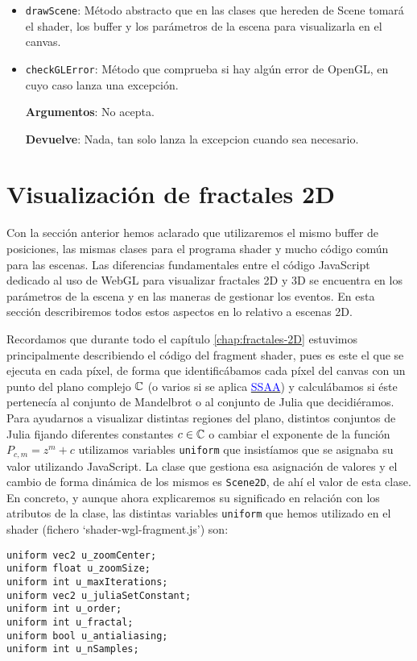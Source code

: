 \begin{itemize}
    \item \verb|drawScene|: Método abstracto que en las clases que hereden de Scene tomará el shader, los buffer y los parámetros de la escena para visualizarla en el canvas.
    
    \item  \verb|checkGLError|: Método que comprueba si hay algún error de OpenGL, en cuyo caso lanza una excepción.
    
    \textbf{Argumentos}: No acepta.
    
    \textbf{Devuelve}: Nada, tan solo lanza la excepcion cuando sea necesario.
\end{itemize}


\section{Visualización de fractales 2D}

Con la sección anterior hemos aclarado que utilizaremos el mismo buffer de posiciones, las mismas clases para el programa shader y mucho código común para las escenas. Las diferencias fundamentales entre el código JavaScript dedicado al uso de WebGL para visualizar fractales 2D y 3D se encuentra en los parámetros de la escena y en las maneras de gestionar los eventos. En esta sección describiremos todos estos aspectos en lo relativo a escenas 2D.

Recordamos que durante todo el capítulo \ref{chap:fractales-2D} estuvimos principalmente describiendo el código del fragment shader, pues es este el que se ejecuta en cada píxel, de forma que identificábamos cada píxel del canvas con un punto del plano complejo $\mathbb{C}$ (o varios si se aplica \hyperref[section:SSAA-2D]{\textcolor{blue}{SSAA}}) y calculábamos si éste pertenecía al conjunto de Mandelbrot o al conjunto de Julia que decidiéramos. Para ayudarnos a visualizar distintas regiones del plano, distintos conjuntos de Julia fijando diferentes constantes $c\in\mathbb{C}$ o cambiar el exponente de la función $P_{c,m}=z^m+c$ utilizamos variables \verb|uniform| que insistíamos que se asignaba su valor utilizando JavaScript. La clase que gestiona esa asignación de valores y el cambio de forma dinámica de los mismos es \verb|Scene2D|, de ahí el valor de esta clase. En concreto, y aunque ahora explicaremos su significado en relación con los atributos de la clase, las distintas variables \verb|uniform| que hemos utilizado en el shader (fichero `shader-wgl-fragment.js') son:

\begin{lstlisting}
uniform vec2 u_zoomCenter;
uniform float u_zoomSize;
uniform int u_maxIterations;
uniform vec2 u_juliaSetConstant;
uniform int u_order;
uniform int u_fractal;
uniform bool u_antialiasing;
uniform int u_nSamples;
\end{lstlisting}

